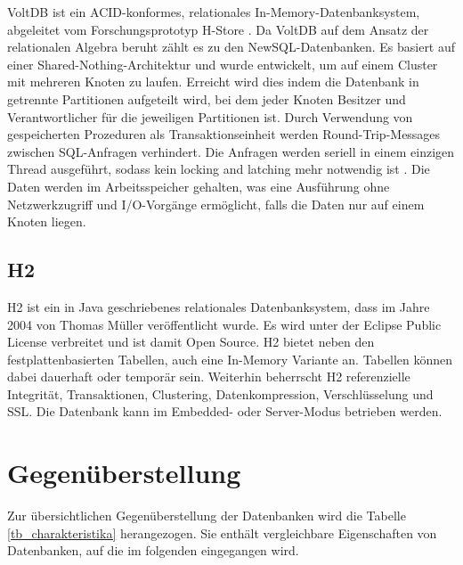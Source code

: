 VoltDB \cite{volt2013a} ist ein ACID-konformes, relationales In-Memory-Datenbanksystem, abgeleitet vom Forschungsprototyp H-Store \cite{kallman08}. Da VoltDB auf dem Ansatz der relationalen Algebra beruht zählt es zu den NewSQL-Datenbanken. Es basiert auf einer Shared-Nothing-Architektur und wurde entwickelt, um auf einem Cluster mit mehreren Knoten zu laufen. Erreicht wird dies indem die Datenbank in getrennte Partitionen aufgeteilt wird, bei dem jeder Knoten Besitzer und Verantwortlicher für die jeweiligen Partitionen ist. Durch Verwendung von gespeicherten Prozeduren als Transaktionseinheit werden Round-Trip-Messages zwischen SQL-Anfragen verhindert. Die Anfragen werden seriell in einem einzigen Thread ausgeführt, sodass kein locking and latching mehr notwendig ist \cite{volt2013b}. Die Daten werden im Arbeitsspeicher gehalten, was eine Ausführung ohne Netzwerkzugriff und I/O-Vorgänge ermöglicht, falls die Daten nur auf einem Knoten liegen.  

\subsection{H2} 
\label{ch:AnalyseDatenbanken:sec:Datenbanken:subsec:H2}

H2 ist ein in Java geschriebenes relationales Datenbanksystem, dass im Jahre 2004 von Thomas Müller veröffentlicht wurde. Es wird unter der Eclipse Public License verbreitet und ist damit Open Source. H2 bietet neben den festplattenbasierten Tabellen, auch eine In-Memory Variante an. Tabellen können dabei dauerhaft oder temporär sein. Weiterhin beherrscht H2 referenzielle Integrität, Transaktionen, Clustering, Datenkompression, Verschlüsselung und SSL. Die Datenbank kann im Embedded- oder Server-Modus betrieben werden.

\section{Gegenüberstellung} 
\label{ch:AnalyseDatenbanken:sec:Gegenüberstellung}

Zur übersichtlichen Gegenüberstellung der Datenbanken wird die Tabelle \ref{tb_charakteristika} herangezogen. Sie enthält vergleichbare Eigenschaften von Datenbanken, auf die im folgenden eingegangen wird. 

